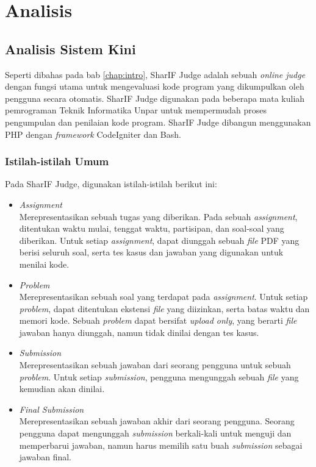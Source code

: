 \chapter{Analisis}
\label{chap:analisis}

\section{Analisis Sistem Kini}
\label{sec:3:analisiskini} 

Seperti dibahas pada bab \ref{chap:intro}, SharIF Judge adalah sebuah \textit{online judge} dengan fungsi utama untuk mengevaluasi kode program yang dikumpulkan oleh pengguna secara otomatis. SharIF Judge digunakan pada beberapa mata kuliah pemrograman Teknik Informatika Unpar untuk mempermudah proses pengumpulan dan penilaian kode program. SharIF Judge dibangun menggunakan PHP dengan \textit{framework} CodeIgniter dan Bash. 

\subsection{Istilah-istilah Umum}
\label{subs:3:assignment}

Pada SharIF Judge, digunakan istilah-istilah berikut ini:

\begin{itemize}
    \item \textit{Assignment} \\ Merepresentasikan sebuah tugas yang diberikan. Pada sebuah \textit{assignment}, ditentukan waktu mulai, tenggat waktu, partisipan, dan soal-soal yang diberikan. Untuk setiap \textit{assignment}, dapat diunggah sebuah \textit{file} PDF yang berisi seluruh soal, serta tes kasus dan jawaban yang digunakan untuk menilai kode.
    \item \textit{Problem} \\ Merepresentasikan sebuah soal yang terdapat pada \textit{assignment}. Untuk setiap \textit{problem}, dapat ditentukan ekstensi \textit{file} yang diizinkan, serta batas waktu dan memori kode. Sebuah \textit{problem} dapat bersifat \textit{upload only}, yang berarti \textit{file} jawaban hanya diunggah, namun tidak dinilai dengan tes kasus.
    \item \textit{Submission} \\ Merepresentasikan sebuah jawaban dari seorang pengguna untuk sebuah \textit{problem}. Untuk setiap \textit{submission}, pengguna mengunggah sebuah \textit{file} yang kemudian akan dinilai.
    \item \textit{Final Submission} \\ Merepresentasikan sebuah jawaban akhir dari seorang pengguna. Seorang pengguna dapat mengunggah \textit{submission} berkali-kali untuk menguji dan memperbarui jawaban, namun harus memilih satu buah \textit{submission} sebagai jawaban final.
\end{itemize}

